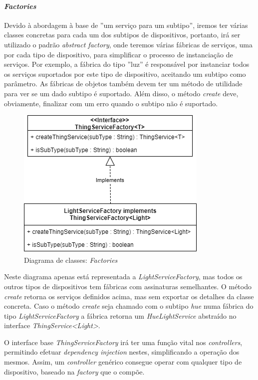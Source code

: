 %
%
%
%

\paragraph*{\textit{Factories}}

Devido à abordagem à base de ''um serviço para um subtipo'', iremos ter várias classes concretas para cada um dos subtipos de dispositivos, portanto, irá ser utilizado o padrão \textit{abstract factory}, onde teremos várias fábricas de serviços, uma por cada tipo de dispositivo, para simplificar o processo de instanciação de serviços. Por exemplo, a fábrica do tipo ''luz'' é responsável por instanciar todos os serviços suportados por este tipo de dispositivo, aceitando um subtipo como parâmetro. As fábricas de objetos também devem ter um método de utilidade para ver se um dado subtipo é suportado. Além disso, o método \textit{create} deve, obviamente, finalizar com um erro quando o subtipo não é suportado.

\begin{figure}[H]
  \centering
        \includegraphics[scale=0.75]{img/hub-factories.png}
  \caption{Diagrama de classes: \textit{Factories}}
\end{figure}

Neste diagrama apenas está representada a \textit{LightServiceFactory}, mas todos os outros tipos de dispositivos tem fábricas com assinaturas semelhantes. O método \textit{create} retorna os serviços definidos acima, mas sem exportar os detalhes da classe concreta. Caso o método \textit{create} seja chamado com o subtipo \textit{hue} numa fábrica do tipo \textit{LightServiceFactory} a fábrica retorna um \textit{HueLightService} abstraído no interface \textit{ThingService<Light>}.

O interface base \textit{ThingServiceFactory} irá ter uma função vital nos \textit{controllers}, permitindo efetuar \textit{dependency injection} nestes, simplificando a operação dos mesmos. Assim, um \textit{controller} genérico consegue operar com qualquer tipo de dispositivo, baseado na \textit{factory} que o compõe.

